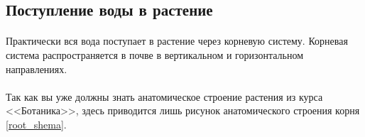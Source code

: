 \subsection*{Поступление воды в растение}

\paragraph*{}Практически вся вода поступает в растение через корневую систему. Корневая система распространяется в почве в вертикальном и горизонтальном направлениях.

\paragraph*{}Так как вы уже должны знать анатомическое строение растения из курса <<Ботаника>>, здесь приводится лишь рисунок анатомического строения корня \ris \ref{root_shema}.


